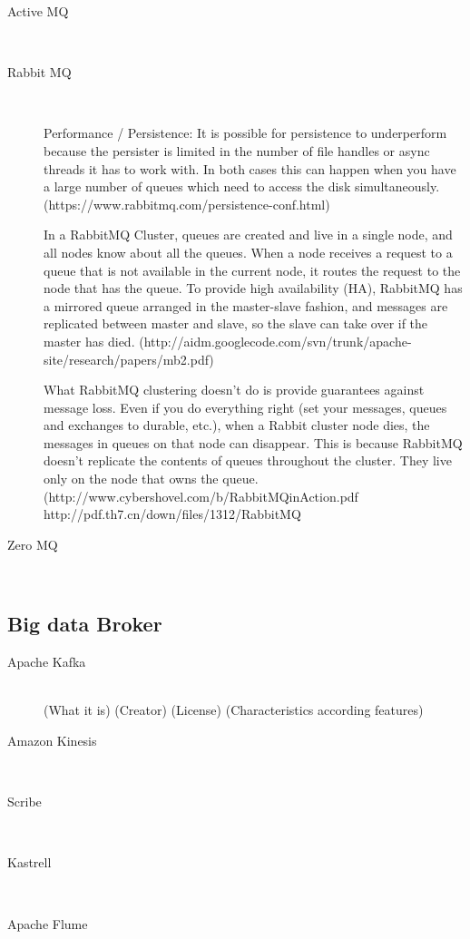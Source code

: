\begin{description}
    \item [Active MQ] \hfill \\
        {}
    \item [Rabbit MQ] \hfill \\
    {
    Performance / Persistence:
    It is possible for persistence to underperform because the persister is
    limited in the number of file handles or async threads it has to work with.
    In both cases this can happen when you have a large number of queues which
    need to access the disk simultaneously. 
    (https://www.rabbitmq.com/persistence-conf.html)


    In a RabbitMQ Cluster, queues are
    created and live in a single node, and all nodes know about
    all the queues. When a node receives a request to a queue
    that is not available in the current node, it routes the request
    to the node that has the queue.
    To provide high availability
    (HA), RabbitMQ has a mirrored queue arranged in the
    master-slave fashion, and messages are replicated between
    master and slave, so the slave can take over if the master
    has died.
    (http://aidm.googlecode.com/svn/trunk/apache-site/research/papers/mb2.pdf)

    What RabbitMQ clustering doesn't do is provide guarantees against message loss.
    Even if you do everything right (set your messages, queues and exchanges to
    durable, etc.), when a Rabbit cluster node dies, the messages in queues on that
    node can disappear. This is because RabbitMQ doesn't replicate the contents
    of queues throughout the cluster. They live only on the node that owns the
    queue.
    (http://www.cybershovel.com/b/RabbitMQinAction.pdf
    http://pdf.th7.cn/down/files/1312/RabbitMQ%

    }
    \item [Zero MQ] \hfill \\
    {}
\end{description}


\subsection{Big data Broker}
\begin{description}
    \item [Apache Kafka] \hfill \\
        { (What it is) (Creator) (License) (Characteristics according features) }
    \item [Amazon Kinesis] \hfill \\
    {}
    \item [Scribe] \hfill \\
    {}
    \item [Kastrell] \hfill \\
    {}
    \item [Apache Flume] \hfill \\
    {}
\end{description}

